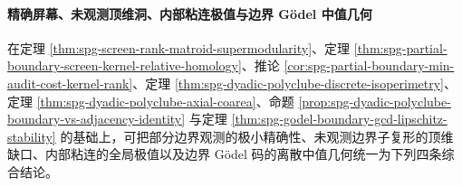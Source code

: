 
\paragraph{精确屏幕、未观测顶维洞、内部粘连极值与边界 Gödel 中值几何}
在定理 \ref{thm:spg-screen-rank-matroid-supermodularity}、定理
\ref{thm:spg-partial-boundary-screen-kernel-relative-homology}、推论
\ref{cor:spg-partial-boundary-min-audit-cost-kernel-rank}、定理
\ref{thm:spg-dyadic-polyclube-discrete-isoperimetry}、定理
\ref{thm:spg-dyadic-polyclube-axial-coarea}、命题
\ref{prop:spg-dyadic-polyclube-boundary-vs-adjacency-identity} 与定理
\ref{thm:spg-godel-boundary-gcd-lipschitz-stability} 的基础上，可把部分边界观测的极小精确性、未观测边界子复形的顶维缺口、内部粘连的全局极值以及边界 Gödel 码的离散中值几何统一为下列四条综合结论。

